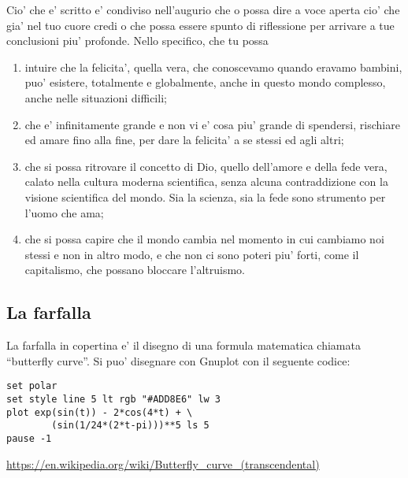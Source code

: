 Cio' che e' scritto e' condiviso nell'augurio che o possa dire a voce aperta cio' che gia' nel tuo cuore credi o che possa essere spunto di riflessione per arrivare a tue conclusioni piu' profonde. Nello specifico, che tu possa 
\begin{enumerate}
    \item intuire che la felicita', quella vera, che conoscevamo quando eravamo bambini, puo' esistere, totalmente e globalmente, anche in questo mondo complesso, anche nelle situazioni difficili;
    \item che e' infinitamente grande e non vi e' cosa piu' grande di spendersi, rischiare ed amare fino alla fine, per dare la felicita' a se stessi ed agli altri;
    \item che si possa ritrovare il concetto di Dio, quello dell'amore e della fede vera, calato nella cultura moderna scientifica, senza alcuna contraddizione con la visione scientifica del mondo. Sia la scienza, sia la fede sono strumento per l'uomo che ama;
    \item che si possa capire che il mondo cambia nel momento in cui cambiamo noi stessi e non in altro modo, e che non ci sono poteri piu' forti, come il capitalismo, che possano bloccare l'altruismo.
\end{enumerate}


\subsection{La farfalla}

La farfalla in copertina e' il disegno di una formula matematica chiamata ``butterfly curve''. Si puo' disegnare con Gnuplot con il seguente codice:
\begin{verbatim}
set polar
set style line 5 lt rgb "#ADD8E6" lw 3
plot exp(sin(t)) - 2*cos(4*t) + \
        (sin(1/24*(2*t-pi)))**5 ls 5
pause -1
\end{verbatim}
\url{https://en.wikipedia.org/wiki/Butterfly\_curve\_(transcendental)}
